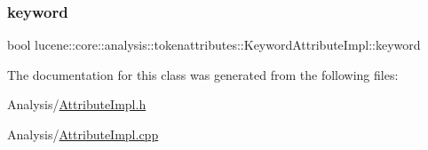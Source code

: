\subsubsection{\texorpdfstring{keyword}{keyword}}
{\footnotesize\ttfamily bool lucene\+::core\+::analysis\+::tokenattributes\+::\+Keyword\+Attribute\+Impl\+::keyword\hspace{0.3cm}{\ttfamily [private]}}



The documentation for this class was generated from the following files\+:\begin{DoxyCompactItemize}
\item 
Analysis/\mbox{\hyperlink{AttributeImpl_8h}{Attribute\+Impl.\+h}}\item 
Analysis/\mbox{\hyperlink{AttributeImpl_8cpp}{Attribute\+Impl.\+cpp}}\end{DoxyCompactItemize}
